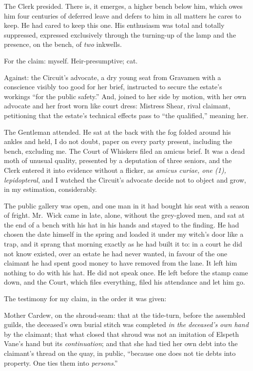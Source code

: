 The Clerk presided. There is, it emerges, a higher bench below him, which owes him four centuries of deferred leave and defers to him in all matters he cares to keep. He had cared to keep this one. His enthusiasm was total and totally suppressed, expressed exclusively through the turning-up of the lamp and the presence, on the bench, of \emph{two} inkwells.

For the claim: myself. Heir-presumptive; cat.

Against: the Circuit's advocate, a dry young seat from Gravamen with a conscience visibly too good for her brief, instructed to secure the estate's workings ``for the public safety.'' And, joined to her side by motion, with her own advocate and her frost worn like court dress: Mistress Shear, rival claimant, petitioning that the estate's technical effects pass to ``the qualified,'' meaning her.

The Gentleman attended. He sat at the back with the fog folded around his ankles and held, I do not doubt, paper on every party present, including the bench, excluding me. The Court of Whiskers filed an amicus brief. It was a dead moth of unusual quality, presented by a deputation of three seniors, and the Clerk entered it into evidence without a flicker, as \emph{amicus curiae, one (1), lepidopteral}, and I watched the Circuit's advocate decide not to object and grow, in my estimation, considerably.

The public gallery was open, and one man in it had bought his seat with a season of fright. Mr.~Wick came in late, alone, without the grey-gloved men, and sat at the end of a bench with his hat in his hands and stayed to the finding. He had chosen the date himself in the spring and loaded it under my witch's door like a trap, and it sprang that morning exactly as he had built it to: in a court he did not know existed, over an estate he had never wanted, in favour of the one claimant he had spent good money to have removed from the lane. It left him nothing to do with his hat. He did not speak once. He left before the stamp came down, and the Court, which files everything, filed his attendance and let him go.

The testimony for my claim, in the order it was given:

Mother Cardew, on the shroud-seam: that at the tide-turn, before the assembled guilds, the deceased's own burial stitch was completed \emph{in the deceased's own hand} by the claimant; that what closed that shroud was not an imitation of Elspeth Vane's hand but its \emph{continuation}; and that she had tied her own debt into the claimant's thread on the quay, in public, ``because one does not tie debts into property. One ties them into \emph{persons}.''

